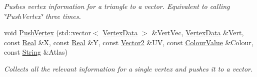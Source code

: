 \begin{DoxyCompactItemize}
\begin{DoxyCompactList}\small\item\em Pushes vertex information for a triangle to a vector. Equivalent to calling \char`\"{}PushVertex\char`\"{} three times. \item\end{DoxyCompactList}\item 
\hypertarget{classMezzanine_1_1UI_1_1BasicRenderable_affc9bcf443b69254a0a59858f316cc58}{
void \hyperlink{classMezzanine_1_1UI_1_1BasicRenderable_affc9bcf443b69254a0a59858f316cc58}{PushVertex} (std::vector$<$ \hyperlink{structMezzanine_1_1UI_1_1VertexData}{VertexData} $>$ \&VertVec, \hyperlink{structMezzanine_1_1UI_1_1VertexData}{VertexData} \&Vert, const \hyperlink{namespaceMezzanine_a726731b1a7df72bf3583e4a97282c6f6}{Real} \&X, const \hyperlink{namespaceMezzanine_a726731b1a7df72bf3583e4a97282c6f6}{Real} \&Y, const \hyperlink{classMezzanine_1_1Vector2}{Vector2} \&UV, const \hyperlink{classMezzanine_1_1ColourValue}{ColourValue} \&Colour, const \hyperlink{namespaceMezzanine_acf9fcc130e6ebf08e3d8491aebcf1c86}{String} \&Atlas)}
\label{classMezzanine_1_1UI_1_1BasicRenderable_affc9bcf443b69254a0a59858f316cc58}

\begin{DoxyCompactList}\small\item\em Collects all the relevant information for a single vertex and pushes it to a vector. \item\end{DoxyCompactList}\end{DoxyCompactItemize}
